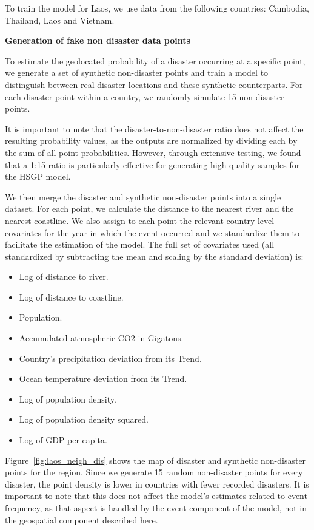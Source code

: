 To train the model for Laos, we use data from the following countries: Cambodia, Thailand, Laos and Vietnam.

\textbf{Generation of fake non disaster data points}

To estimate the geolocated probability of a disaster occurring at a specific point, we generate a set of synthetic non-disaster points and train a model to distinguish between real disaster locations and these synthetic counterparts. For each disaster point within a country, we randomly simulate 15 non-disaster points.

It is important to note that the disaster-to-non-disaster ratio does not affect the resulting probability values, as the outputs are normalized by dividing each by the sum of all point probabilities. However, through extensive testing, we found that a 1:15 ratio is particularly effective for generating high-quality samples for the HSGP model.

We then merge the disaster and synthetic non-disaster points into a single dataset. For each point, we calculate the distance to the nearest river and the nearest coastline. We also assign to each point the relevant country-level covariates for the year in which the event occurred and we standardize them to facilitate the estimation of the model. The full set of covariates used (all standardized by subtracting the mean and scaling by the standard deviation) is:

\begin{itemize}
    \item Log of distance to river.
    \item Log of distance to coastline.
    \item Population.
    \item Accumulated atmospheric CO2 in Gigatons.
    \item Country's precipitation deviation from its Trend.
    \item Ocean temperature deviation from its Trend.
    \item Log of population density.
    \item Log of population density squared.
    \item Log of GDP per capita.
\end{itemize}

Figure~\ref{fig:laos_neigh_dis} shows the map of disaster and synthetic non-disaster points for the region. Since we generate 15 random non-disaster points for every disaster, the point density is lower in countries with fewer recorded disasters. It is important to note that this does not affect the model's estimates related to event frequency, as that aspect is handled by the event component of the model, not in the geospatial component described here.

